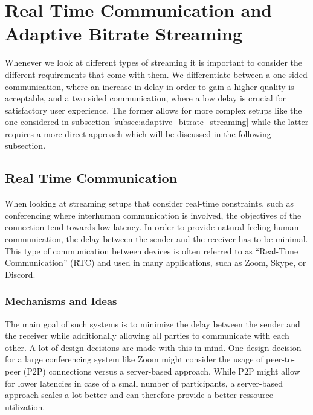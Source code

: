 \section{Real Time Communication and Adaptive Bitrate Streaming}\label{sec:rt_and_adaptive_bitrate_streaming}

Whenever we look at different types of streaming it is important to consider the 
different requirements that come with them.
We differentiate between a one sided communication, where an increase in delay 
in order to gain a higher quality is acceptable, and a two sided communication, 
where a low delay is crucial for satisfactory user experience.
The former allows for more complex setups like the one considered in subsection
\nobreakspace\ref{subsec:adaptive_bitrate_streaming} while the latter requires
a more direct approach which will be discussed in the following subsection.

\subsection{Real Time Communication}
When looking at streaming setups that consider real-time constraints, such as conferencing 
where interhuman communication is involved, the objectives of the connection tend towards
low latency.
In order to provide natural feeling human communication, the delay between the sender 
and the receiver has to be minimal.
This type of communication between devices is often referred to as ``Real-Time Communication'' 
(RTC) and used in many applications, such as Zoom, Skype, or Discord.

\subsubsection{Mechanisms and Ideas}
The main goal of such systems is to minimize the delay between the sender and the receiver
while additionally allowing all parties to communicate with each other.
A lot of design decisions are made with this in mind.
One design decision for a large conferencing system like Zoom
might consider the usage of peer-to-peer (P2P) connections versus a server-based
approach.
While P2P might allow for lower latencies in case of a small number of participants,
a server-based approach scales a lot better and can therefore provide a better
ressource utilization.

